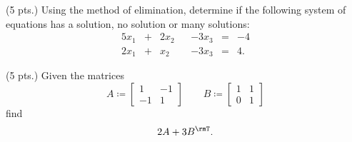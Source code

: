 
\begin{problem}(5 pts.)
  Using the method of elimination, determine if the following system of
  equations has a solution, no solution or many solutions:
  \begin{alignat*}{5}
    x_1&+&2x_2&&-3x_3&=&-4\\
    2x_1&+&x_2&&-3x_3&=&4.\nonumber
  \end{alignat*}
\end{problem}
\bigskip\bigskip\bigskip\bigskip\bigskip\bigskip
\bigskip\bigskip\bigskip\bigskip\bigskip\bigskip
\begin{problem}(5 pts.)
  Given the matrices
  \[
    A\coloneq
    \begin{bmatrix}
      1&-1\\
      -1&1
    \end{bmatrix}
    \qquad
    B\coloneq
    \begin{bmatrix}
      1&1\\
      0&1
    \end{bmatrix}
  \]
  find
  \[
   2A+3B^\rmT.
  \]
\end{problem}

